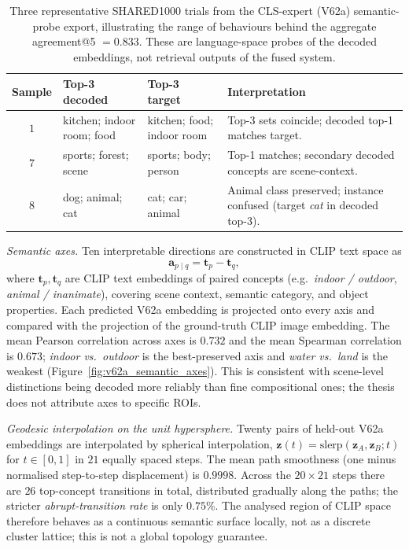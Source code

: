 \begin{table}[htbp]
\centering
\scriptsize
\setlength{\tabcolsep}{5pt}
\begin{tabular}{@{}c p{2.9cm} p{2.9cm} p{5.0cm}@{}}
\toprule
\textbf{Sample} & \textbf{Top-3 decoded} & \textbf{Top-3 target} & \textbf{Interpretation} \\
\midrule
$1$ & kitchen; indoor room; food & kitchen; food; indoor room & Top-3 sets coincide; decoded top-1 matches target. \\
$7$ & sports; forest; scene & sports; body; person & Top-1 matches; secondary decoded concepts are scene-context. \\
$8$ & dog; animal; cat & cat; car; animal & Animal class preserved; instance confused (target \emph{cat} in decoded top-3). \\
\bottomrule
\end{tabular}
\caption{Three representative SHARED1000 trials from the CLS-expert (V62a) semantic-probe export, illustrating the range of behaviours behind the aggregate agreement@5 $= 0.833$. These are language-space probes of the decoded embeddings, not retrieval outputs of the fused system.}
\label{tab:text_probe_examples}
\end{table}

\emph{Semantic axes.} Ten interpretable directions are constructed in CLIP text space as
\begin{equation}
    \mathbf{a}_{p \mid q} = \mathbf{t}_p - \mathbf{t}_q,
    \label{eq:semantic_axis}
\end{equation}
where $\mathbf{t}_p,\mathbf{t}_q$ are CLIP text embeddings of paired concepts (e.g.\ \emph{indoor / outdoor}, \emph{animal / inanimate}), covering scene context, semantic category, and object properties. Each predicted V62a embedding is projected onto every axis and compared with the projection of the ground-truth CLIP image embedding. The mean Pearson correlation across axes is $0.732$ and the mean Spearman correlation is $0.673$; \emph{indoor vs.\ outdoor} is the best-preserved axis and \emph{water vs.\ land} is the weakest (Figure~\ref{fig:v62a_semantic_axes}). This is consistent with scene-level distinctions being decoded more reliably than fine compositional ones; the thesis does not attribute axes to specific ROIs.

\emph{Geodesic interpolation on the unit hypersphere.} Twenty pairs of held-out V62a embeddings are interpolated by spherical interpolation, $\mathbf{z}(t) = \mathrm{slerp}(\mathbf{z}_A, \mathbf{z}_B; t)$ for $t \in [0,1]$ in $21$ equally spaced steps. The mean path smoothness (one minus normalised step-to-step displacement) is $0.9998$. Across the $20 \times 21$ steps there are $26$ top-concept transitions in total, distributed gradually along the paths; the stricter \emph{abrupt-transition rate} is only $0.75\%$. The analysed region of CLIP space therefore behaves as a continuous semantic surface locally, not as a discrete cluster lattice; this is not a global topology guarantee.

